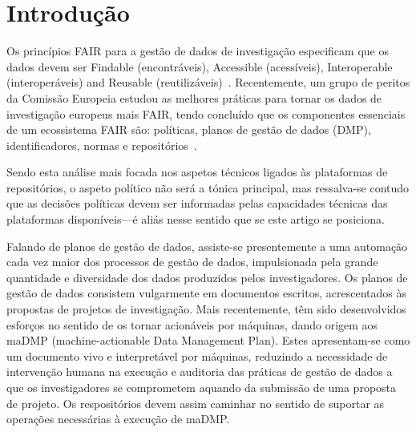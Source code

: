 \documentclass[sigconf,nonacm]{acmart}
\begin{document}

\maketitle

\section{Introdução}

Os princípios FAIR para a gestão de dados de investigação especificam que os dados devem ser Findable (encontráveis), Accessible (acessíveis), Interoperable (interoperáveis) and Reusable (reutilizáveis)~\cite{wilkinson2016fair}. Recentemente, um grupo de peritos da Comissão Europeia estudou as melhores práticas para tornar os dados de investigação europeus mais FAIR, tendo concluído que os componentes essenciais de um ecossistema FAIR são: políticas, planos de gestão de dados (DMP), identificadores, normas e repositórios~\cite{hodson2018turning}. 

Sendo esta análise mais focada nos aspetos técnicos ligados às plataformas de repositórios, o aspeto político não será a tónica principal, mas ressalva-se contudo que as decisões políticas devem ser informadas pelas capacidades técnicas das plataformas disponíveis---é aliás nesse sentido que se este artigo se posiciona. 

Falando de planos de gestão de dados, assiste-se presentemente a uma automação cada vez maior dos processos de gestão de dados, impulsionada pela grande quantidade e diversidade dos dados produzidos pelos investigadores. Os planos de gestão de dados consistem vulgarmente em documentos escritos, acrescentados às propostas de projetos de investigação. Mais recentemente, têm sido desenvolvidos esforços no sentido de os tornar acionáveis por máquinas, dando origem aos maDMP (machine-actionable Data Management Plan). Estes apresentam-se como um documento vivo e interpretável por máquinas,  reduzindo a necessidade de intervenção humana na execução e auditoria das práticas de gestão de dados a que os investigadores se comprometem aquando da submissão de uma proposta de projeto. Os respositórios devem assim caminhar no sentido de suportar as operações necessárias à execução de maDMP. 
\end{document}
